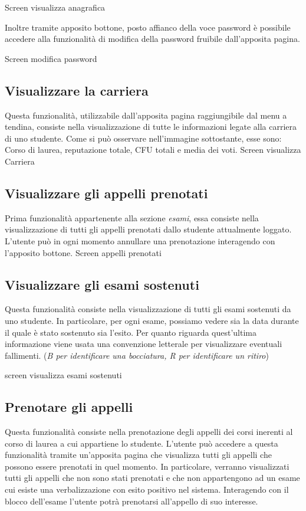 \documentclass [a4paper,11pt]{book}
\begin{document}
Screen visualizza anagrafica 

Inoltre tramite apposito bottone, posto affianco della voce password è possibile accedere alla funzionalità di modifica della password fruibile dall'apposita pagina.

Screen modifica password
\medskip

\subsection{Visualizzare la carriera}

Questa funzionalità, utilizzabile dall'apposita pagina raggiungibile dal menu a tendina, consiste nella visualizzazione di tutte le informazioni legate alla carriera di uno studente. Come si può osservare nell'immagine sottostante, esse sono: Corso di laurea, reputazione totale, CFU totali e media dei voti.
Screen visualizza Carriera
\medskip

\subsection{Visualizzare gli appelli prenotati}

Prima funzionalità appartenente alla sezione \emph{esami}, essa consiste nella visualizzazione di tutti gli appelli prenotati dallo studente attualmente loggato. L'utente può in ogni momento annullare una prenotazione interagendo con l'apposito bottone.
Screen appelli prenotati
\medskip

\subsection{Visualizzare gli esami sostenuti}

Questa funzionalità consiste nella visualizzazione di tutti gli esami sostenuti da uno studente. In particolare, per ogni esame, possiamo vedere sia la data durante il quale è stato sostenuto sia l'esito.
Per quanto riguarda quest'ultima informazione viene usata una convenzione letterale per visualizzare eventuali fallimenti. (\emph{B per identificare una bocciatura, R per identificare un ritiro})

screen visualizza esami sostenuti 
\medskip

\subsection{Prenotare gli appelli}

Questa funzionalità consiste nella prenotazione degli appelli dei corsi inerenti al corso di laurea a cui appartiene lo studente.
L'utente può accedere a questa funzionalità tramite un'apposita pagina che visualizza tutti gli appelli che possono essere prenotati in quel momento. In particolare, verranno visualizzati tutti gli appelli che non sono stati prenotati e che non appartengono ad un esame cui esiste una verbalizzazione con esito positivo nel sistema.
Interagendo con il blocco dell'esame l'utente potrà prenotarsi all'appello di suo interesse. 
\end{document}
